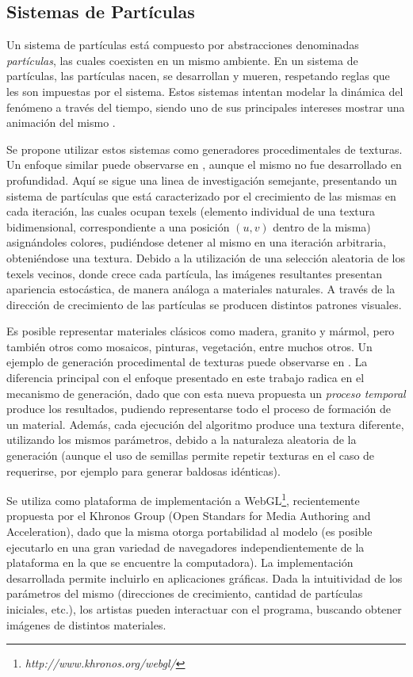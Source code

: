 \subsection{Sistemas de Partículas}
Un sistema de partículas está compuesto por abstracciones denominadas {\em partículas}, las cuales coexisten en un mismo ambiente.
En un sistema de part\'iculas, las part\'iculas nacen, se desarrollan y mueren, respetando reglas que les son impuestas por el sistema. Estos sistemas intentan modelar la din\'amica del fen\'omeno a trav\'es del tiempo, siendo uno de sus principales intereses mostrar una animaci\'on del mismo \cite{Gao2010, Bagar2010, Lentine2010}.

Se propone utilizar estos sistemas como generadores procedimentales de texturas. Un enfoque similar puede observarse en \cite{Kranidotis98}, aunque el mismo no fue desarrollado en profundidad.
Aquí se sigue una linea de investigaci\'on semejante, presentando un sistema de part\'iculas que est\'a caracterizado por el crecimiento de las mismas en cada iteraci\'on, las cuales ocupan texels (elemento individual de una textura bidimensional, correspondiente a una posición $(u,v)$ dentro de la misma) asign\'andoles colores, pudi\'endose detener al mismo en una iteración arbitraria, obteni\'endose una textura.
Debido a la utilización de una selección aleatoria de los texels vecinos, donde crece cada partícula, las im\'agenes resultantes presentan apariencia estocástica, de manera análoga a materiales naturales.
A trav\'es de la direcci\'on de crecimiento de las part\'iculas se producen distintos patrones visuales.

Es posible representar materiales cl\'asicos como madera, granito y m\'armol, pero tambi\'en otros como mosaicos, pinturas, vegetaci\'on, entre muchos otros.
Un ejemplo de generación procedimental de texturas puede observarse en \cite{Baravalle2010}.
La diferencia principal con el enfoque presentado en este trabajo radica en el mecanismo de generaci\'on, dado que con esta nueva propuesta un {\em proceso temporal} produce los resultados, pudiendo representarse todo el proceso de formaci\'on de un material.
Adem\'as, cada ejecución del algoritmo produce una textura diferente, utilizando los mismos par\'ametros, debido a la naturaleza aleatoria de la generaci\'on (aunque el uso de semillas permite repetir texturas en el caso de requerirse, por ejemplo para generar baldosas id\'enticas).

Se utiliza como plataforma de implementaci\'on a WebGL\footnote{\em http://www.khronos.org/webgl/}, recientemente propuesta por el Khronos Group (Open Standars for Media Authoring and Acceleration), dado que la misma otorga portabilidad al modelo (es posible ejecutarlo en una gran variedad de navegadores independientemente de la plataforma en la que se encuentre la computadora). 
La implementación desarrollada permite incluirlo en aplicaciones gr\'aficas.
Dada la intuitividad de los parámetros del mismo (direcciones de crecimiento, cantidad de partículas iniciales, etc.), los artistas pueden interactuar con el programa, buscando obtener imágenes de distintos materiales.

